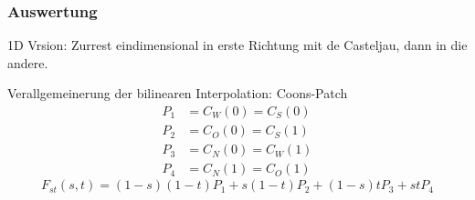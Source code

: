 \subsubsection{Auswertung}
1D Vrsion: Zurrest eindimensional in erste Richtung mit de Casteljau, dann in die andere.

Verallgemeinerung der bilinearen Interpolation: Coons-Patch
\begin{align*}
	P_1 &= C_W(0) = C_S(0) \\
	P_2 &= C_O(0) = C_S(1) \\
	P_3 &= C_N(0) = C_W(1) \\
	P_4 &= C_N(1) = C_O(1)
\end{align*} 
$$
	F_{st}(s,t)=(1-s)(1-t)P_1 + s(1-t)P_2 + (1-s)tP_3 + stP_4
$$